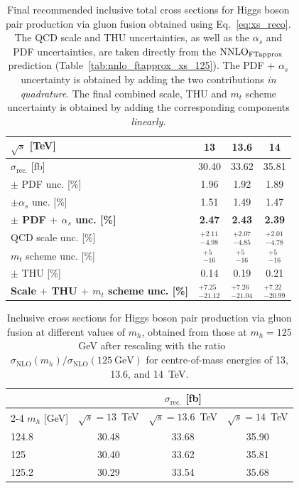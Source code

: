 \begin{table}[htbp]
\begin{center}
\begin{tabular}{lccc}
\toprule
$\sqrt{s}$ [TeV] & \textbf{13} & \textbf{13.6} & \textbf{14} \\
\midrule
$\sigma_\mathrm{rec.}$ [fb] & 30.40 & 33.62 & 35.81 \\\hline
$\pm$ PDF unc. [\%] & 1.96 & 1.92 & 1.89 \\
$\pm \alpha_s$ unc. [\%] & 1.51 & 1.49 & 1.47 \\
{\bfseries\boldmath $\pm$ PDF $+$ $\alpha_s$ unc. [\%]} & \textbf{2.47} & \textbf{2.43} & \textbf{2.39} \\\hline
QCD scale unc. [\%] & $^{+2.11}_{-4.98}$ & $^{+2.07}_{-4.85}$ & $^{+2.01}_{-4.78}$ \\
$m_t$ scheme unc. [\%] & $^{+5}_{-16}$ & $^{+5}_{-16}$ & $^{+5}_{-16}$ \\
$\pm$ THU [\%] & 0.14 & 0.19 & 0.21 \\
{\bfseries\boldmath Scale $+$ THU $+$ $m_t$ scheme unc. [\%]} & {\bfseries\boldmath $^{+7.25}_{-21.12}$} & {\bfseries\boldmath $^{+7.26}_{-21.04}$} & {\bfseries\boldmath $^{+7.22}_{-20.99}$} \\
\bottomrule
\end{tabular}
\caption{Final recommended inclusive total cross sections for Higgs boson pair production via gluon fusion obtained using Eq.~\eqref{eq:xs_reco}.
The QCD scale and THU uncertainties, as well as the $\alpha_s$ and PDF uncertainties, are taken directly from the $\textup{NNLO}_{\textup{FTapprox}}$ prediction (Table~\ref{tab:nnlo_ftapprox_xs_125}). The PDF $+$ $\alpha_s$ uncertainty is obtained by adding the two contributions \textit{in quadrature}. The final combined scale, THU and $m_t$ scheme uncertainty is obtained by adding the corresponding components \textit{linearly}.}
\label{tab:final_xs_reco_125}
\end{center}
\end{table}

\begin{table}[htbp]
\centering
\begin{tabular}{@{}lccc@{}}
\toprule
& \multicolumn{3}{c}{$\sigma_{\mathrm{rec.}}$ [fb]} \\
\cmidrule(lr){2-4}
$m_h$ [GeV] & $\sqrt{s}=13$~TeV
& $\sqrt{s}=13.6$~TeV
& $\sqrt{s}=14$~TeV \\
\midrule
124.8 & 30.48 & 33.68 & 35.90 \\
125 & 30.40 & 33.62 & 35.81 \\
125.2 & 30.29 & 33.54 & 35.68 \\
\bottomrule
\end{tabular}
\caption{Inclusive cross sections for Higgs boson pair production via gluon fusion
at different values of $m_h$, obtained from those at $m_h = 125$~GeV after rescaling
with the ratio $\sigma_{\mathrm{NLO}}(m_h)/\sigma_{\mathrm{NLO}}(125~\mathrm{GeV})$
for centre-of-mass energies of 13, 13.6, and 14~TeV.}
\label{tab:final_xs_reco_125_mh}
\end{table}


